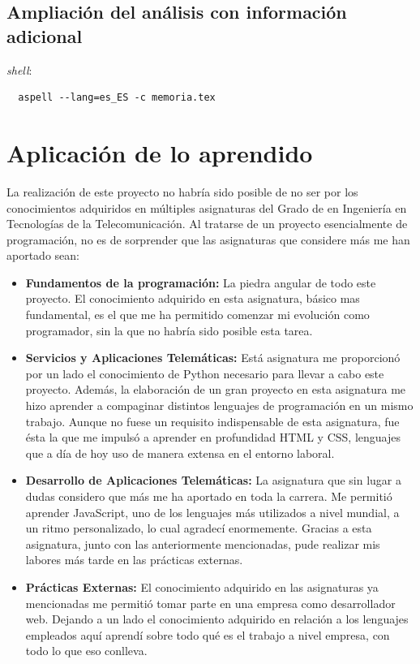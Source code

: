 \documentclass[a4paper, 12pt]{book}
\begin{document}
\subsection{Ampliación del análisis con información adicional}


\emph{shell}:

\begin{verbatim}
  aspell --lang=es_ES -c memoria.tex
\end{verbatim}

\section{Aplicación de lo aprendido}
\label{sec:aplicacion}

La realización de este proyecto no habría sido posible de no ser por los conocimientos adquiridos en múltiples asignaturas del Grado de en Ingeniería en Tecnologías de la Telecomunicación. Al tratarse de un proyecto esencialmente de programación, no es de sorprender que las asignaturas que considere más me han aportado sean:

\begin{itemize}
    \item \textbf{Fundamentos de la programación: } La piedra angular de todo este proyecto. El conocimiento adquirido en esta asignatura, básico mas fundamental, es el que me ha permitido comenzar mi evolución como programador, sin la que no habría sido posible esta tarea.

    \item \textbf{Servicios y Aplicaciones Telemáticas: } Está asignatura me proporcionó por un lado el conocimiento de Python necesario para llevar a cabo este proyecto. Además, la elaboración de un gran proyecto en esta asignatura me hizo aprender a compaginar distintos lenguajes de programación en un mismo trabajo. Aunque no fuese un requisito indispensable de esta asignatura, fue ésta la que me impulsó a aprender en profundidad HTML y CSS, lenguajes que a día de hoy uso de manera extensa en el entorno laboral.

    \item \textbf{Desarrollo de Aplicaciones Telemáticas: } La asignatura que sin lugar a dudas considero que más me ha aportado en toda la carrera. Me permitió aprender JavaScript, uno de los lenguajes más utilizados a nivel mundial, a un ritmo personalizado, lo cual agradecí enormemente. Gracias a esta asignatura, junto con las anteriormente mencionadas, pude realizar mis labores más tarde en las prácticas externas.

    \item \textbf{Prácticas Externas: } El conocimiento adquirido en las asignaturas ya mencionadas me permitió tomar parte en una empresa como desarrollador web. Dejando a un lado el conocimiento adquirido en relación a los lenguajes empleados aquí aprendí sobre todo qué es el trabajo a nivel empresa, con todo lo que eso conlleva.
    
\end{itemize}
\end{document}
